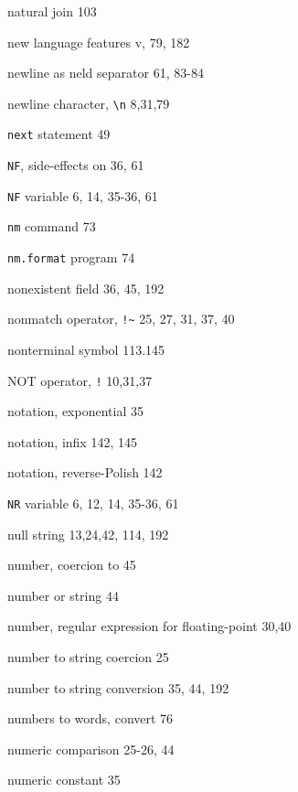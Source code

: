 \begin{multicols}{3}
\hangindent=3pc  natural join 103

\hangindent=3pc  new language features v, 79, 182

\hangindent=3pc  newline as neld separator 61,  83-84

\hangindent=3pc  newline character, \verb'\n' 8,31,79

\hangindent=3pc  \verb'next' statement 49

\hangindent=3pc  \verb'NF', side-effects on 36, 61

\hangindent=3pc  \verb'NF' variable 6, 14, 35-36, 61

\hangindent=3pc  \verb'nm' command 73

\hangindent=3pc  \verb'nm.format' program 74


\hangindent=3pc  nonexistent field 36, 45, 192

\hangindent=3pc  nonmatch operator, \verb'!~' 25, 27, 31, 37, 40

\hangindent=3pc  nonterminal symbol 113.145

\hangindent=3pc  NOT operator, \verb'!' 10,31,37

\hangindent=3pc  notation, exponential 35

\hangindent=3pc  notation, infix 142, 145

\hangindent=3pc  notation, reverse-Polish 142

\hangindent=3pc  \verb'NR' variable 6, 12, 14, 35-36, 61

\hangindent=3pc  null string 13,24,42, 114, 192

\hangindent=3pc  number, coercion to 45

\hangindent=3pc  number or string 44

\hangindent=3pc  number, regular expression for floating-point 30,40

\hangindent=3pc  number to string coercion 25

\hangindent=3pc  number to string conversion 35,  44, 192

\hangindent=3pc  numbers to words, convert 76

\hangindent=3pc  numeric comparison 25-26, 44

\hangindent=3pc  numeric constant 35


\end{multicols}

